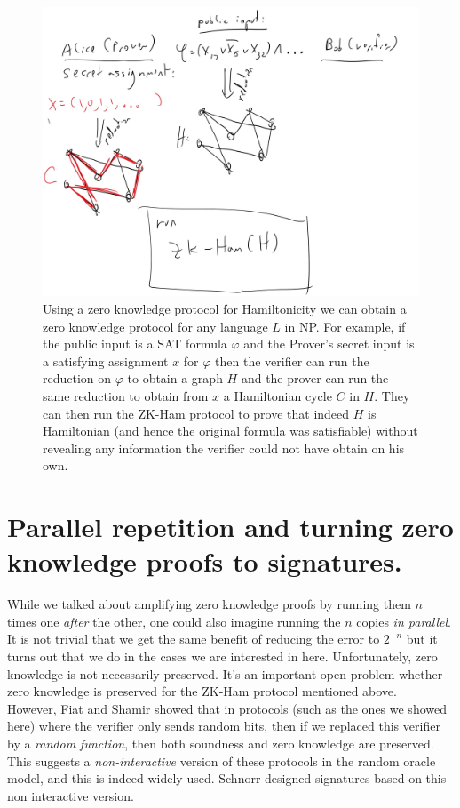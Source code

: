 \begin{figure}
\centering
\includegraphics[width=\textwidth, height=0.25\paperheight, keepaspectratio]{../figure/zk-ham.jpg}
\caption{Using a zero knowledge protocol for Hamiltonicity we can obtain
a zero knowledge protocol for any language \(L\) in NP. For example, if
the public input is a SAT formula \(\varphi\) and the Prover's secret
input is a satisfying assignment \(x\) for \(\varphi\) then the verifier
can run the reduction on \(\varphi\) to obtain a graph \(H\) and the
prover can run the same reduction to obtain from \(x\) a Hamiltonian
cycle \(C\) in \(H\). They can then run the ZK-Ham protocol to prove
that indeed \(H\) is Hamiltonian (and hence the original formula was
satisfiable) without revealing any information the verifier could not
have obtain on his own.}
\label{tmplabelfig}
\end{figure}

\section{Parallel repetition and turning zero knowledge proofs to
signatures.}\label{13-Parallel-repetition-an}

While we talked about amplifying zero knowledge proofs by running them
\(n\) times one \emph{after} the other, one could also imagine running
the \(n\) copies \emph{in parallel}. It is not trivial that we get the
same benefit of reducing the error to \(2^{-n}\) but it turns out that
we do in the cases we are interested in here. Unfortunately, zero
knowledge is not necessarily preserved. It's an important open problem
whether zero knowledge is preserved for the ZK-Ham protocol mentioned
above.\\
However, Fiat and Shamir showed that in protocols (such as the ones we
showed here) where the verifier only sends random bits, then if we
replaced this verifier by a \emph{random function}, then both soundness
and zero knowledge are preserved. This suggests a \emph{non-interactive}
version of these protocols in the random oracle model, and this is
indeed widely used. Schnorr designed signatures based on this non
interactive version.


